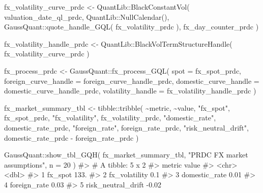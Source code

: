 \documentclass[
  letterpaper,
  DIV=11,
  numbers=noendperiod]{scrreprt}
\newenvironment{Shaded}{\begin{snugshade}}{\end{snugshade}}
\newcommand{\AttributeTok}[1]{\textcolor[rgb]{0.40,0.45,0.13}{#1}}
\newcommand{\CommentTok}[1]{\textcolor[rgb]{0.37,0.37,0.37}{#1}}
\newcommand{\DecValTok}[1]{\textcolor[rgb]{0.68,0.00,0.00}{#1}}
\newcommand{\FunctionTok}[1]{\textcolor[rgb]{0.28,0.35,0.67}{#1}}
\newcommand{\NormalTok}[1]{\textcolor[rgb]{0.00,0.23,0.31}{#1}}
\newcommand{\OtherTok}[1]{\textcolor[rgb]{0.00,0.23,0.31}{#1}}
\newcommand{\SpecialCharTok}[1]{\textcolor[rgb]{0.37,0.37,0.37}{#1}}
\newcommand{\StringTok}[1]{\textcolor[rgb]{0.13,0.47,0.30}{#1}}
\begin{document}
\begin{Shaded}
\begin{Highlighting}[]
\NormalTok{fx\_volatility\_curve\_prdc }\OtherTok{\textless{}{-}}\NormalTok{ QuantLib}\SpecialCharTok{::}\FunctionTok{BlackConstantVol}\NormalTok{(}
\NormalTok{  valuation\_date\_ql\_prdc,}
\NormalTok{  QuantLib}\SpecialCharTok{::}\FunctionTok{NullCalendar}\NormalTok{(),}
\NormalTok{  GaussQuant}\SpecialCharTok{::}\FunctionTok{quote\_handle\_GQL}\NormalTok{(}
\NormalTok{    fx\_volatility\_prdc}
\NormalTok{  ),}
\NormalTok{  fx\_day\_counter\_prdc}
\NormalTok{)}

\NormalTok{fx\_volatility\_handle\_prdc }\OtherTok{\textless{}{-}}\NormalTok{ QuantLib}\SpecialCharTok{::}\FunctionTok{BlackVolTermStructureHandle}\NormalTok{(}
\NormalTok{  fx\_volatility\_curve\_prdc}
\NormalTok{)}

\NormalTok{fx\_process\_prdc }\OtherTok{\textless{}{-}}\NormalTok{ GaussQuant}\SpecialCharTok{::}\FunctionTok{fx\_process\_GQL}\NormalTok{(}
  \AttributeTok{spot =}\NormalTok{ fx\_spot\_prdc,}
  \AttributeTok{foreign\_curve\_handle =}\NormalTok{ foreign\_curve\_handle\_prdc,}
  \AttributeTok{domestic\_curve\_handle =}\NormalTok{ domestic\_curve\_handle\_prdc,}
  \AttributeTok{volatility\_handle =}\NormalTok{ fx\_volatility\_handle\_prdc}
\NormalTok{)}

\NormalTok{fx\_market\_summary\_tbl }\OtherTok{\textless{}{-}}\NormalTok{ tibble}\SpecialCharTok{::}\FunctionTok{tribble}\NormalTok{(}
  \SpecialCharTok{\textasciitilde{}}\NormalTok{metric,               }\SpecialCharTok{\textasciitilde{}}\NormalTok{value,}
  \StringTok{"fx\_spot"}\NormalTok{,              fx\_spot\_prdc,}
  \StringTok{"fx\_volatility"}\NormalTok{,        fx\_volatility\_prdc,}
  \StringTok{"domestic\_rate"}\NormalTok{,        domestic\_rate\_prdc,}
  \StringTok{"foreign\_rate"}\NormalTok{,         foreign\_rate\_prdc,}
  \StringTok{"risk\_neutral\_drift"}\NormalTok{,   domestic\_rate\_prdc }\SpecialCharTok{{-}}
\NormalTok{                            foreign\_rate\_prdc}
\NormalTok{)}

\NormalTok{GaussQuant}\SpecialCharTok{::}\FunctionTok{show\_tbl\_GQH}\NormalTok{(}
\NormalTok{  fx\_market\_summary\_tbl,}
  \StringTok{"PRDC FX market assumptions"}\NormalTok{,}
  \AttributeTok{n =} \DecValTok{20}
\NormalTok{)}
\CommentTok{\#\textgreater{} \# A tibble: 5 x 2}
\CommentTok{\#\textgreater{}   metric              value}
\CommentTok{\#\textgreater{}   \textless{}chr\textgreater{}               \textless{}dbl\textgreater{}}
\CommentTok{\#\textgreater{} 1 fx\_spot            133.  }
\CommentTok{\#\textgreater{} 2 fx\_volatility        0.1 }
\CommentTok{\#\textgreater{} 3 domestic\_rate        0.01}
\CommentTok{\#\textgreater{} 4 foreign\_rate         0.03}
\CommentTok{\#\textgreater{} 5 risk\_neutral\_drift  {-}0.02}
\end{Highlighting}
\end{Shaded}
\end{document}
